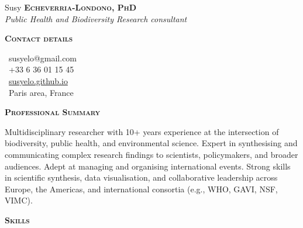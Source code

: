 \documentclass[10pt, a4paper]{article}
\newcommand{\headleft}[1]{\vspace*{3ex}\textsc{\textbf{#1}}\par%
    \vspace*{-1.5ex}\hrulefill\par\vspace*{0.7ex}}
\begin{document}
\setlength{\topskip}{0pt}
\setlength{\parindent}{0pt}
\setlength{\parskip}{0pt}
\setlength{\fboxsep}{0pt}
\pagestyle{empty}
\raggedbottom

\begin{minipage}[t]{0.33\textwidth} %
\colorbox{cvblue}{\begin{minipage}[t][5mm][t]{\textwidth}\null\hfill\null\end{minipage}}

\vspace{-.2ex} %
\colorbox{cvblue!90}{\color{white}  %
\textwidth\relax%
\begin{minipage}[t][293mm][t]{0.82\textwidth}
\raggedright
\vspace*{2.5ex}

\Large Susy \textbf{\textsc{Echeverria-Londono, PhD}} \normalsize  \\
\emph{Public Health and Biodiversity Research consultant}



\headleft{Contact details}
\small %
\MVAt\ {\small susyelo@gmail.com} \\[0.4ex]
\Mobilefone\ +33 6 36 01 15 45 \\[0.5ex]
\Mundus\ \href{https://susyelo.github.io/}{susyelo.github.io} \\[0.1ex]
\Letter\ Paris area, France
\normalsize


\headleft{Professional Summary}
Multidisciplinary researcher with 10+ years experience at the intersection of biodiversity, public health, and environmental science. Expert in synthesising and communicating complex research findings to scientists, policymakers, and broader audiences. Adept at managing and organising international events. Strong skills in scientific synthesis, data visualisation, and collaborative leadership across Europe, the Americas, and international consortia (e.g., WHO, GAVI, NSF, VIMC).

\headleft{Skills}
\begin{itemize}


\end{itemize}
\end{minipage}}
\end{minipage}
\end{document}
